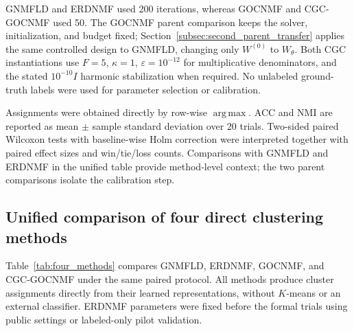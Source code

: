 \documentclass[11pt]{article}
\theoremstyle{remark}
\newcommand{\eps}{\varepsilon}
\newcommand{\argmaxop}{\operatorname*{arg\,max}}
\begin{document}
GNMFLD and ERDNMF used 200 iterations, whereas GOCNMF and CGC-GOCNMF used 50. The GOCNMF parent comparison keeps the solver, initialization, and budget fixed; Section~\ref{subsec:second_parent_transfer} applies the same controlled design to GNMFLD, changing only $W^{(0)}$ to $W_\theta$. Both CGC instantiations use $F=5$, $\kappa=1$, $\eps=10^{-12}$ for multiplicative denominators, and the stated $10^{-10}I$ harmonic stabilization when required. No unlabeled ground-truth labels were used for parameter selection or calibration.

Assignments were obtained directly by row-wise $\argmaxop$. ACC and NMI are reported as mean $\pm$ sample standard deviation over 20 trials. Two-sided paired Wilcoxon tests \cite{Wilcoxon1945} with baseline-wise Holm correction were interpreted together with paired effect sizes and win/tie/loss counts. Comparisons with GNMFLD and ERDNMF in the unified table provide method-level context; the two parent comparisons isolate the calibration step.

\subsection{Unified comparison of four direct clustering methods}

Table~\ref{tab:four_methods} compares GNMFLD, ERDNMF, GOCNMF, and CGC-GOCNMF under the same paired protocol. All methods produce cluster assignments directly from their learned representations, without $K$-means or an external classifier. ERDNMF parameters were fixed before the formal trials using public settings or labeled-only pilot validation.
\end{document}
